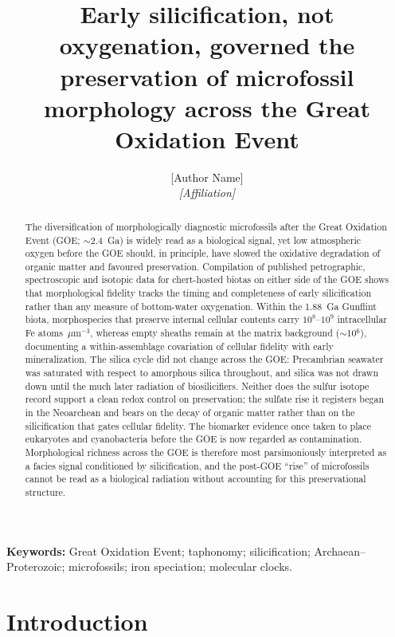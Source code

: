 \documentclass[11pt]{article}
\title{\vspace{-1.0cm}\textbf{Early silicification, not oxygenation, governed the preservation of
microfossil morphology across the Great Oxidation Event}}
\author{[Author Name]\\
\small\textit{[Affiliation]}}
\date{}
\begin{document}
\maketitle

\begin{abstract}
\noindent The diversification of morphologically diagnostic microfossils after the Great Oxidation
Event (GOE; $\sim$2.4~Ga) is widely read as a biological signal, yet low atmospheric oxygen before
the GOE should, in principle, have slowed the oxidative degradation of organic matter and favoured
preservation. Compilation of published petrographic, spectroscopic and isotopic data for chert-hosted
biotas on either side of the GOE shows that morphological fidelity tracks the timing and completeness
of early silicification rather than any measure of bottom-water oxygenation. Within the 1.88~Ga
Gunflint biota, morphospecies that preserve internal cellular contents carry $10^{8}$--$10^{9}$
intracellular Fe atoms~$\mu$m$^{-3}$, whereas empty sheaths remain at the matrix background
($\sim$10$^{6}$), documenting a within-assemblage covariation of cellular fidelity with early
mineralization. The silica cycle did not change across the GOE: Precambrian seawater was saturated
with respect to amorphous silica throughout, and silica was not drawn down until the much later
radiation of biosilicifiers. Neither does the sulfur isotope record support a clean redox control on
preservation; the sulfate rise it registers began in the Neoarchean and bears on the decay of organic
matter rather than on the silicification that gates cellular fidelity. The biomarker evidence once
taken to place eukaryotes and cyanobacteria before the GOE is now regarded as contamination.
Morphological richness across the GOE is therefore most parsimoniously interpreted as a facies signal
conditioned by silicification, and the post-GOE ``rise'' of microfossils cannot be read as a
biological radiation without accounting for this preservational structure.
\end{abstract}

\noindent\textbf{Keywords:} Great Oxidation Event; taphonomy; silicification; Archaean--Proterozoic;
microfossils; iron speciation; molecular clocks.

\section{Introduction}
\end{document}
